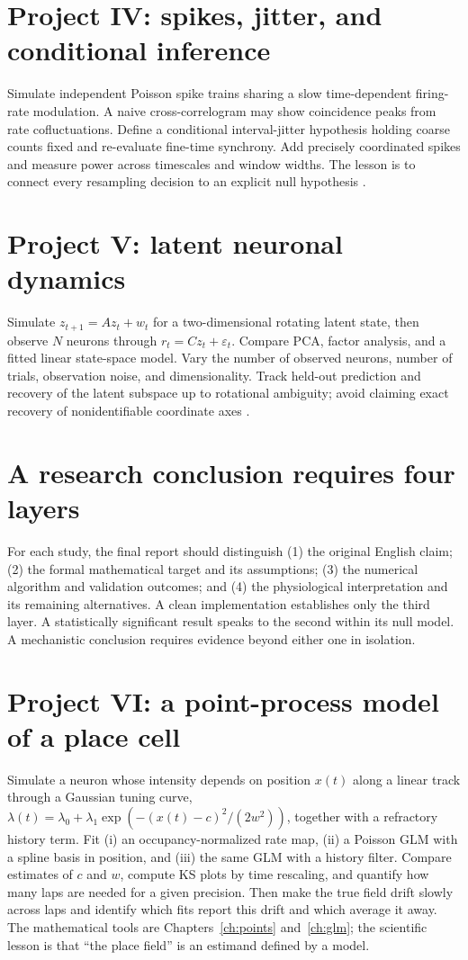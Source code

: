 \section{Project IV: spikes, jitter, and conditional inference}
Simulate independent Poisson spike trains sharing a slow time-dependent firing-rate modulation. A naive cross-correlogram may show coincidence peaks from rate cofluctuations. Define a conditional interval-jitter hypothesis holding coarse counts fixed and re-evaluate fine-time synchrony. Add precisely coordinated spikes and measure power across timescales and window widths. The lesson is to connect every resampling decision to an explicit null hypothesis \cite{Amarasingham2012}.

\section{Project V: latent neuronal dynamics}
Simulate $z_{t+1}=Az_t+w_t$ for a two-dimensional rotating latent state, then observe $N$ neurons through $r_t=Cz_t+\varepsilon_t$. Compare PCA, factor analysis, and a fitted linear state-space model. Vary the number of observed neurons, number of trials, observation noise, and dimensionality. Track held-out prediction and recovery of the latent subspace up to rotational ambiguity; avoid claiming exact recovery of nonidentifiable coordinate axes \cite{Churchland2012,CunninghamYu2014,Gallego2017}.

\section{A research conclusion requires four layers}
For each study, the final report should distinguish (1) the original English claim; (2) the formal mathematical target and its assumptions; (3) the numerical algorithm and validation outcomes; and (4) the physiological interpretation and its remaining alternatives. A clean implementation establishes only the third layer. A statistically significant result speaks to the second within its null model. A mechanistic conclusion requires evidence beyond either one in isolation.

\section{Project VI: a point-process model of a place cell}
Simulate a neuron whose intensity depends on position $x(t)$ along a linear track through a Gaussian tuning curve, $\lambda(t)=\lambda_0+\lambda_1\exp(-(x(t)-c)^2/(2w^2))$, together with a refractory history term. Fit (i) an occupancy-normalized rate map, (ii) a Poisson GLM with a spline basis in position, and (iii) the same GLM with a history filter. Compare estimates of $c$ and $w$, compute KS plots by time rescaling, and quantify how many laps are needed for a given precision. Then make the true field drift slowly across laps and identify which fits report this drift and which average it away. The mathematical tools are Chapters~\ref{ch:points} and~\ref{ch:glm}; the scientific lesson is that ``the place field'' is an estimand defined by a model.


